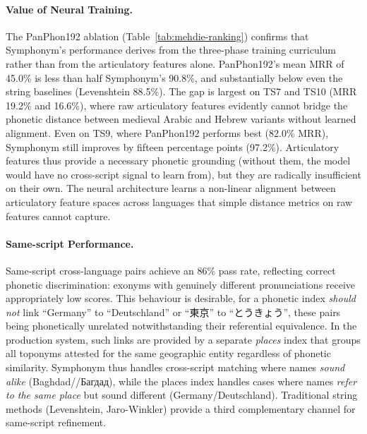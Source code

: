\documentclass[11pt,a4paper]{article}
\newcommand{\textar}[1]{{\arabicfont\RL{#1}}}
\newcommand{\textcn}[1]{{\chinesefont #1}}
\newcommand{\textjp}[1]{{\chinesefont #1}}
\begin{document}
\paragraph{Value of Neural Training.} The PanPhon192 ablation (Table~\ref{tab:mehdie-ranking}) confirms that Symphonym's performance derives from the three-phase training curriculum rather than from the articulatory features alone. PanPhon192's mean MRR of 45.0\% is less than half Symphonym's 90.8\%, and substantially below even the string baselines (Levenshtein 88.5\%). The gap is largest on TS7 and TS10 (MRR 19.2\% and 16.6\%), where raw articulatory features evidently cannot bridge the phonetic distance between medieval Arabic and Hebrew variants without learned alignment. Even on TS9, where PanPhon192 performs best (82.0\% MRR), Symphonym still improves by fifteen percentage points (97.2\%). Articulatory features thus provide a necessary phonetic grounding (without them, the model would have no cross-script signal to learn from), but they are radically insufficient on their own. The neural architecture learns a non-linear alignment between articulatory feature spaces across languages that simple distance metrics on raw features cannot capture.

\paragraph{Same-script Performance.} Same-script cross-language pairs achieve an 86\% pass rate, reflecting correct phonetic discrimination: exonyms with genuinely different pronunciations receive appropriately low scores. This behaviour is desirable, for a phonetic index \emph{should not} link ``Germany'' to ``Deutschland'' or ``\textcn{東京}'' to ``\textjp{とうきょう}'', these pairs being phonetically unrelated notwithstanding their referential equivalence. In the production system, such links are provided by a separate \emph{places} index that groups all toponyms attested for the same geographic entity regardless of phonetic similarity. Symphonym thus handles cross-script matching where names \emph{sound alike} (Baghdad/\textar{بغداد}/Багдад), while the places index handles cases where names \emph{refer to the same place} but sound different (Germany/Deutschland). Traditional string methods (Levenshtein, Jaro-Winkler) provide a third complementary channel for same-script refinement.
\end{document}
